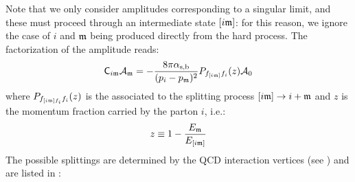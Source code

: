 Note that we only consider amplitudes corresponding to a singular limit, and these must proceed through an intermediate state $ [i\mathfrak{m}] $: for this reason, we ignore the case of $ i $ and $ \mathfrak{m} $ being produced directly from the hard process. The factorization of the amplitude reads:
\begin{equation}
  \mathsf{C}_{i\mathfrak{m}} \mathcal{A}_{\mathfrak{m}} = - \frac{8\pi \alpha_\text{s,b}}{(p_i - p_{\mathfrak{m}})^2} P_{f_{[i\mathfrak{m}]}f_i}(z) \mathcal{A}_0
  \label{eq:catani-spl}
\end{equation}
where $ P_{f_{[i\mathfrak{m}]f_i}f_i}(z) $ is the  associated to the splitting process $ [i\mathfrak{m}] \rightarrow i + \mathfrak{m} $ and $ z $ is the momentum fraction carried by the parton $ i $, i.e.:
\begin{equation}
  z \equiv 1 - \frac{E_{\mathfrak{m}}}{E_{[i\mathfrak{m}]}}
\end{equation}
The possible splittings are determined by the QCD interaction vertices (see ) and are listed in :
